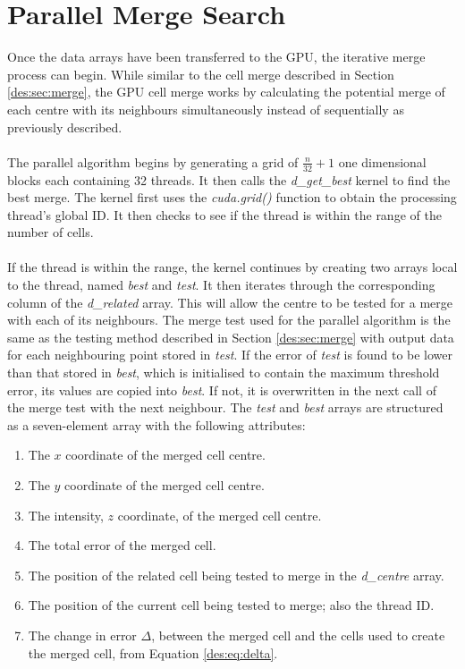 \section{Parallel Merge Search}
Once the data arrays have been transferred to the GPU, the iterative merge process can begin. While similar to the cell merge described in Section \ref{des:sec:merge}, the GPU cell merge works by calculating the potential merge of each centre with its neighbours simultaneously instead of sequentially as previously described.
\\
\\
The parallel algorithm begins by generating a grid of $\frac{n}{32}+1$ one dimensional blocks each containing 32 threads. It then calls the \textit{d\_get\_best} kernel to find the best merge. The kernel first uses the \textit{cuda.grid()} function to obtain the processing thread's global ID. It then checks to see if the thread is within the range of the number of cells.
\\
\\
If the thread is within the range, the kernel continues by creating two arrays local to the thread, named \textit{best} and \textit{test}. It then iterates through the corresponding column of the \textit{d\_related} array. This will allow the centre to be tested for a merge with each of its neighbours. The merge test used for the parallel algorithm is the same as the testing method described in Section \ref{des:sec:merge} with output data for each neighbouring point stored in \textit{test}. If the error of \textit{test} is found to be lower than that stored in \textit{best}, which is initialised to contain the maximum threshold error, its values are copied into \textit{best}. If not, it is overwritten in the next call of the merge test with the next neighbour. The \textit{test} and \textit{best} arrays are structured as a seven-element array with the following attributes:
\begin{enumerate}
\item The $x$ coordinate of the merged cell centre.
\item The $y$ coordinate of the merged cell centre.
\item The intensity, $z$ coordinate, of the merged cell centre.
\item The total error of the merged cell.
\item The position of the related cell being tested to merge in the \textit{d\_centre} array.
\item The position of the current cell being tested to merge; also the thread ID.
\item The change in error $\Delta$, between the merged cell and the cells used to create the merged cell, from Equation \ref{des:eq:delta}.
\end{enumerate}
